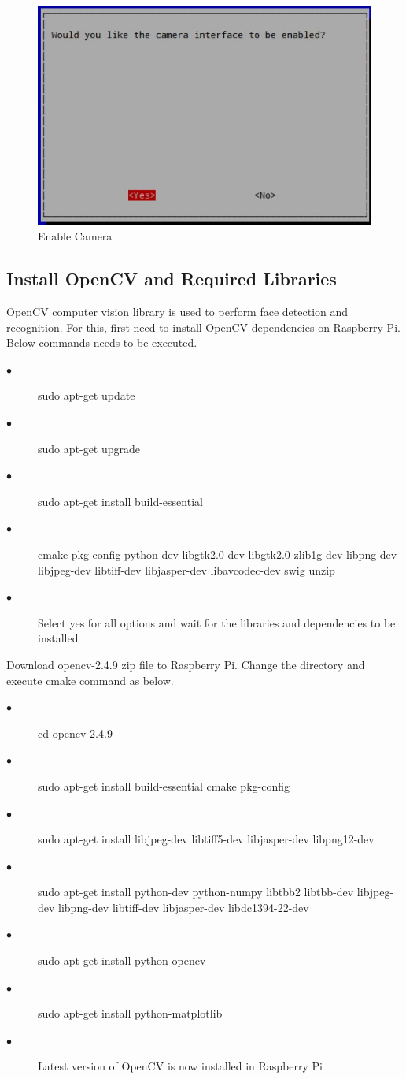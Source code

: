 \documentclass[sigconf]{acmart}
\begin{document}
\begin{figure}[ht!]
  \includegraphics[width=\columnwidth]{images/enablecamera3.jpg}
  \caption{Enable Camera}
\end{figure}

\subsection{Install OpenCV and Required Libraries}
OpenCV computer vision library is used to perform face detection and recognition. For this, first need to install OpenCV dependencies on Raspberry Pi. Below commands needs to be executed. 
\begin{description}
    \item[$\bullet$] sudo apt-get update
    \item[$\bullet$] sudo apt-get upgrade
    \item[$\bullet$] sudo apt-get install build-essential
    \item[$\bullet$] cmake pkg-config python-dev libgtk2.0-dev libgtk2.0 zlib1g-dev libpng-dev libjpeg-dev libtiff-dev libjasper-dev libavcodec-dev swig unzip
    \item[$\bullet$] Select yes for all options and wait for the libraries and dependencies to be installed
\end{description}
Download opencv-2.4.9 zip file to Raspberry Pi. Change the directory and execute cmake command as below.
\begin{description}
    \item[$\bullet$] cd opencv-2.4.9
    \item[$\bullet$] sudo apt-get install build-essential cmake pkg-config
    \item[$\bullet$] sudo apt-get install libjpeg-dev libtiff5-dev libjasper-dev libpng12-dev
    \item[$\bullet$] sudo apt-get install python-dev python-numpy libtbb2 libtbb-dev libjpeg-dev libpng-dev libtiff-dev libjasper-dev libdc1394-22-dev
    \item[$\bullet$] sudo apt-get install python-opencv
    \item[$\bullet$] sudo apt-get install python-matplotlib
    \item[$\bullet$] Latest version of OpenCV is now installed in Raspberry Pi
\end{description}
\end{document}
